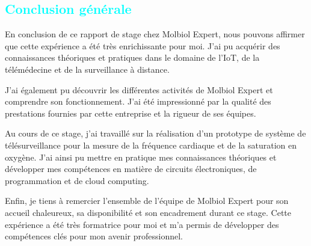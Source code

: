 \newpage

\begin{flushleft}
	\section*{\textcolor{cyan}{Conclusion générale}}
	En conclusion de ce rapport de stage chez Molbiol Expert, nous pouvons affirmer que cette expérience a été très enrichissante pour moi. J'ai pu acquérir des connaissances théoriques et pratiques dans le domaine de l'IoT, de la télémédecine et de la surveillance à distance.
	
	J'ai également pu découvrir les différentes activités de Molbiol Expert et comprendre son fonctionnement. J'ai été impressionné par la qualité des prestations fournies par cette entreprise et la rigueur de ses équipes.
	
	Au cours de ce stage, j'ai travaillé sur la réalisation d'un prototype de système de télésurveillance pour la mesure de la fréquence cardiaque et de la saturation en oxygène. J'ai ainsi pu mettre en pratique mes connaissances théoriques et développer mes compétences en matière de circuits électroniques, de programmation et de cloud computing.
	
	Enfin, je tiens à remercier l'ensemble de l'équipe de Molbiol Expert pour son accueil chaleureux, sa disponibilité et son encadrement durant ce stage. Cette expérience a été très formatrice pour moi et m'a permis de développer des compétences clés pour mon avenir professionnel.
\end{flushleft}

\newpage
